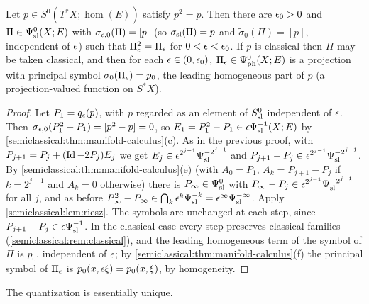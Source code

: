 \begin{theorem}\label{semiclassical:thm:projection}
  Let $p\in S^0(T^*X;\hom(E))$ satisfy $p^2=p$. Then there are $\epsilon_0>0$ and
  $\Pi\in\Psi^{0}_{\mathrm{sl}}(X;E)$ with $\sigma_{\epsilon,0}(\Pi)=[p]$ (so $\sigma_{\mathrm{sl}}(\Pi)=p$ and
  $\tilde\sigma_0(\Pi)=[p]$, independent of $\epsilon$) such that $\Pi_\epsilon^2=\Pi_\epsilon$ for
  $0<\epsilon<\epsilon_0$. If $p$ is classical then $\Pi$ may be taken classical, and then
  for each $\epsilon\in(0,\epsilon_0)$, $\Pi_\epsilon\in\Psi^{0}_{\mathrm{ph}}(X;E)$ is a projection
  with principal symbol $\sigma_0(\Pi_\epsilon)=p_0$, the leading homogeneous part of
  $p$ (a projection-valued function on $S^*X$).
\end{theorem}
\begin{proof}
  Let $P_1=q_\epsilon(p)$, with $p$ regarded as an element of $S^{0}_{\mathrm{sl}}$ independent of
  $\epsilon$. Then $\sigma_{\epsilon,0}(P_1^2-P_1)=[p^2-p]=0$, so
  $E_1=P_1^2-P_1\in\epsilon\Psi^{-1}_{\mathrm{sl}}(X;E)$ by
  \cref{semiclassical:thm:manifold-calculus}(c). As in the previous proof, with
  $P_{j+1}=P_j+(\operatorname{Id}-2P_j)E_j$ we get $E_j\in\epsilon^{2^{j-1}}\Psi^{-2^{j-1}}_{\mathrm{sl}}$ and
  $P_{j+1}-P_j\in\epsilon^{2^{j-1}}\Psi^{-2^{j-1}}_{\mathrm{sl}}$. By
  \cref{semiclassical:thm:manifold-calculus}(e) (with $A_0=P_1$, $A_k=P_{j+1}-P_j$ if
  $k=2^{j-1}$ and $A_k=0$ otherwise) there is $P_\infty\in\Psi^{0}_{\mathrm{sl}}$ with
  $P_\infty-P_j\in\epsilon^{2^{j-1}}\Psi^{-2^{j-1}}_{\mathrm{sl}}$ for all $j$, and as before
  $P_\infty^2-P_\infty\in\bigcap_k\epsilon^k\Psi^{-k}_{\mathrm{sl}}=\epsilon^\infty\Psi^{-\infty}_{\mathrm{sl}}$. Apply
  \cref{semiclassical:lem:riesz}. The symbols are unchanged at each step, since
  $P_{j+1}-P_j\in\epsilon\Psi^{-1}_{\mathrm{sl}}$. In the classical case every step preserves
  classical families (\cref{semiclassical:rem:classical}), and the leading
  homogeneous term of the symbol of $\Pi$ is $p_0$, independent of $\epsilon$; by
  \cref{semiclassical:thm:manifold-calculus}(f) the principal symbol of $\Pi_\epsilon$ is
  $p_0(x,\epsilon\xi)=p_0(x,\xi)$, by homogeneity.
\end{proof}

The quantization is essentially unique.

